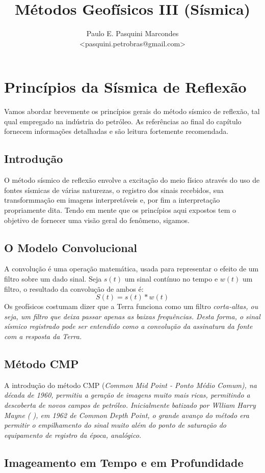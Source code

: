 \documentclass[a4paper,11pt]{scrbook}
\title{M\'etodos Geof\'isicos III (S\'ismica)}
\author{Paulo E. Pasquini Marcondes \\<pasquini.petrobras@gmail.com>}
\begin{document}
\maketitle


\chapter{Princ\'ipios da S\'ismica de Reflex\~ao}

Vamos abordar brevemente os princ\'ipios gerais do m\'etodo s\'ismico de reflex\~ao,
tal qual empregado na ind\'ustria do petr\'oleo.
As refer\^encias ao final do cap\'itulo fornecem informa\c{c}\~oes detalhadas e s\~ao leitura fortemente recomendada.
	
	\section{Introdu\c{c}\~ao}
O m\'etodo s\'ismico de reflexão envolve a excita\c{c}\~ao do meio f\'isico atrav\'es do uso de fontes s\'ismicas de v\'arias naturezas, o registro dos sinais recebidos, sua transformma\c{c}\~ao em imagens interpret\'aveis e, por fim a interpreta\c{c}\~ao propriamente dita.
Tendo em mente que os princ\'ipios aqui expostos tem o objetivo de fornecer uma vis\~ao geral do fen\^omeno, sigamos.

	\section{O Modelo Convolucional}
A convolu\c{c}\~ao \'e uma opera\c{c}\~ao matem\'atica, usada para representar o efeito de um filtro sobre um dado sinal.
Seja $s(t)$ um sinal cont\'inuo no tempo e $w(t)$ um filtro, o resultado da convolu\c{c}\~ao de ambos \'e:
\begin{equation}
S(t) = s(t) * w(t)
\end{equation}
Os geof\'isicos costumam dizer que a Terra funciona como um filtro \em{corta-altas}, ou seja, um filtro que deixa passar apenas as baixas frequ\^encias.
Desta forma, o sinal s\'ismico registrado pode ser entendido como a convolu\c{c}\~ao da assinatura da fonte com a resposta da Terra.
	\section{M\'etodo CMP}
A introdu\c{c}\~ao do m\'etodo CMP (\em{Common Mid Point} - Ponto M\'edio Comum), na d\'ecada de 1960, permitiu a gera\c{c}\~ao de imagens muito mais ricas, permitindo a descoberta de novos campos de petr\'oleo.
Inicialmente batizado por Wlliam Harry Mayne (  \dagger), em 1962 de \em{Common Depth Point}, o grande avan\c{c}o do m\'etodo era permitir o empilhamento do sinal muito al\'em do ponto de satura\c{c}\~ao do equipamento de registro da \'epoca, anal\'ogico.
	\section{Imageamento em Tempo e em Profundidade}
\end{document}
